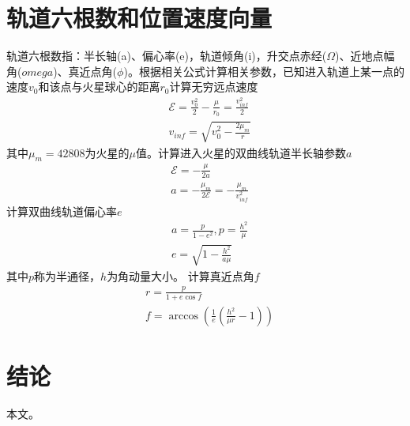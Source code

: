 \section{轨道六根数和位置速度向量}
轨道六根数指：半长轴(a)、偏心率(e)，轨道倾角(i)，升交点赤经($\Omega$)、近地点幅角($omega$)、真近点角($\phi$)。根据相关公式\cite{bruiter2012}计算相关参数，已知进入轨道上某一点的速度$v_0$和该点与火星球心的距离$r_0$计算无穷远点速度
\[\begin{aligned}
    &\mathcal{E}=\frac{v_0^2}{2}-\frac{\mu}{r_0} = \frac{v_{inf}^2}{2} \\
    &v_{inf}=\sqrt{v_0^2-\frac{2\mu_m}{r}}
\end{aligned}\]
其中$\mu_m=42808$为火星的$\mu$值。计算进入火星的双曲线轨道半长轴参数$a$
\[\begin{aligned}
    &\mathcal{E}=-\frac{\mu}{2a} \\
    &a=-\frac{\mu_m}{2\mathcal{E}}=-\frac{\mu_m}{v_{inf}^2}
\end{aligned}\]
计算双曲线轨道偏心率$e$
\[\begin{aligned}
    &a=\frac{p}{1-e^2},p=\frac{h^2}{\mu} \\
    &e=\sqrt{1-\frac{h^2}{a\mu}}
\end{aligned}\]
其中$p$称为半通径，$h$为角动量大小。
计算真近点角$f$
\[\begin{aligned}
    &r=\frac{p}{1+e\cos f} \\
    &f=\arccos(\frac{1}{e}(\frac{h^2}{\mu r}-1))
\end{aligned}\]


\section{结\quad 论}
本文。



